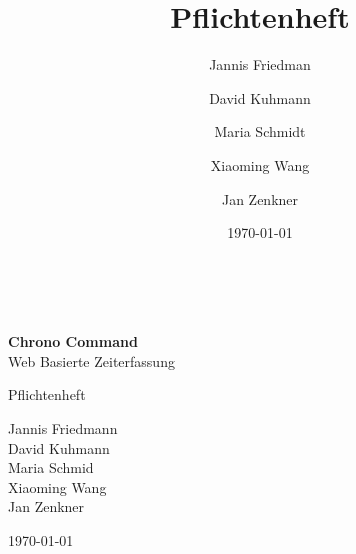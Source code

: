 \documentclass{scrartcl}
\begin{document}
\setlength{\parindent}{0pt}

\begin{titlepage}
\begin{center}
\begin{minipage}{0.4\textwidth}
\end{minipage}

\begin{minipage}{0.4\textwidth}
\end{minipage} \\[2cm]
\end{center}

\begin{center}
	{\huge \bfseries Chrono Command}\\[0.1cm]
	{\large  Web Basierte Zeiterfassung}
\end{center}

\begin{center}
	{\Large Pflichtenheft}\\[0.5cm]
\end{center}

\begin{center}
	{Jannis Friedmann \\
	David Kuhmann \\
	Maria Schmid \\
	Xiaoming Wang \\
	Jan Zenkner} \\[1cm]

\end{center}

\begin{center}
	{\large \today}
\end{center}
	
	\vfill
	


\end{titlepage}

\iffalse
\title{Pflichtenheft}
\author{ 
	Jannis Friedman\and
	David Kuhmann\and
	Maria Schmidt\and
	Xiaoming Wang\and
	Jan Zenkner
}
\date{\today}
\end{document}
